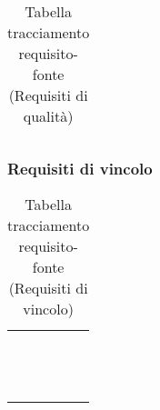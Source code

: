 {{{{{{{\begin{center}
\begin{longtable}{|p{7.5cm}|p{7.5cm}|}
\caption[Tabella tracciamento requisito-fonte]{Tabella tracciamento requisito-fonte (Requisiti di qualità)}\label{4.7}\\
\end{longtable}
\end{center}

\clearpage
\subsubsection{Requisiti di vincolo}\label{RequisitiTracciamentoDeiRequisitiFonteRequisitiDiVincolo}
		
\def\tabularxcolumn#1{m{#1}}
{
	\begin{center}
		\renewcommand{\arraystretch}{1.4}
		\begin{longtable}{|p{7.5cm}|p{7.5cm}|}	
		\hline
		\rowcolor{airforceblue}
		\makecell[tc]{\textbf{Codice RS}} & \makecell[c]{\textbf{Fonte}}  \\
		\makecell[tc]{RSVO1} & \makecell[tc]{Capitolato$_{\scaleto{G}{3pt}}$}\\
		\hline	
		\makecell[tc]{RSVO1.1} & \makecell[tc]{Capitolato$_{\scaleto{G}{3pt}}$}\\
		\hline
		\makecell[tc]{RSVO1.2} & \makecell[tc]{V. esterno 2021-02-02}\\
		\hline
		\makecell[tc]{RSVF2} & \makecell[tc]{V. esterno 2021-02-02}\\
		\hline
		\makecell[tc]{RSVO3} & \makecell[tc]{Capitolato$_{\scaleto{G}{3pt}}$}\\
		\hline
		\makecell[tc]{RSVO4} & \makecell[tc]{Capitolato$_{\scaleto{G}{3pt}}$}\\
		\hline
		\makecell[tc]{RSVO5} & \makecell[tc]{Interno}\\
		\hline
		\makecell[tc]{RSVF6} & \makecell[tc]{Interno}\\
		\hline
		\makecell[tc]{RSVO7} & \makecell[tc]{Capitolato$_{\scaleto{G}{3pt}}$}\\
		\hline
		\makecell[tc]{RSVF8} & \makecell[tc]{V. esterno 2021-02-02}\\
		\hline
		\makecell[tc]{RSVO9} & \makecell[tc]{Interno}\\
		\hline
		\rowcolor{white}

		\caption[Tabella tracciamento requisito-fonte]{Tabella tracciamento requisito-fonte (Requisiti di vincolo)}\label{4.8}\\
	\end{longtable}
\end{center}
\clearpage

}}}}}}}}
